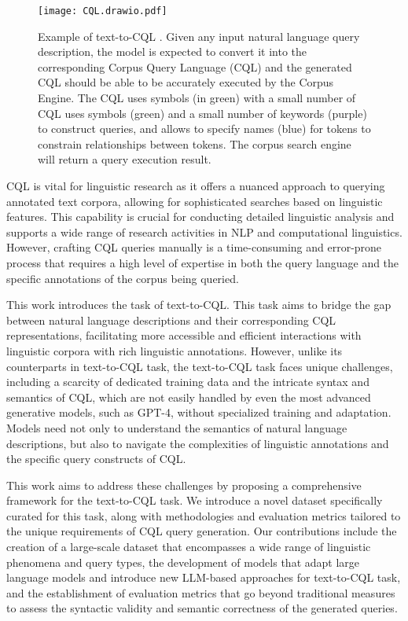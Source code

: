 \documentclass[11pt]{article}
\begin{document}
\begin{CJK*}{UTF8}{gbsn}
\begin{figure}[t]
    \centering
    \texttt{[image: CQL.drawio.pdf]}
    \caption{Example of text-to-CQL . Given any input natural language query description, the model is expected to convert it into the corresponding Corpus Query Language (CQL) and the generated CQL should be able to be accurately executed by the Corpus Engine. The CQL uses symbols (in green) with a small number of CQL uses symbols (green) and a small number of keywords (purple) to construct queries, and allows to specify names (blue) for tokens to constrain relationships between tokens. The corpus search engine will return a query execution result.}
    \label{fig:cql}
\end{figure}


CQL is vital for linguistic research as it offers a nuanced approach to querying annotated text corpora, allowing for sophisticated searches based on linguistic features. This capability is crucial for conducting detailed linguistic analysis and supports a wide range of research activities in NLP and computational linguistics. However, crafting CQL queries manually is a time-consuming and error-prone process that requires a high level of expertise in both the query language and the specific annotations of the corpus being queried.

This work introduces the task of text-to-CQL. This task aims to bridge the gap between natural language descriptions and their corresponding CQL representations, facilitating more accessible and efficient interactions with linguistic corpora with rich linguistic annotations. However, unlike its counterparts in text-to-CQL task, the text-to-CQL task faces unique challenges, including a scarcity of dedicated training data and the intricate syntax and semantics of CQL, which are not easily handled by even the most advanced generative models, such as GPT-4, without specialized training and adaptation.
Models need not only to understand the semantics of natural language descriptions, but also to navigate the complexities of linguistic annotations and the specific query constructs of CQL.

This work aims to address these challenges by proposing a comprehensive framework for the text-to-CQL task. We introduce a novel dataset specifically curated for this task, along with methodologies and evaluation metrics tailored to the unique requirements of CQL query generation. Our contributions include the creation of a large-scale dataset that encompasses a wide range of linguistic phenomena and query types, the development of models that adapt large language models and introduce new LLM-based approaches for text-to-CQL task, and the establishment of evaluation metrics that go beyond traditional measures to assess the syntactic validity and semantic correctness of the generated queries.


\end{CJK*}
\end{document}
